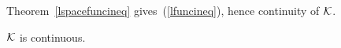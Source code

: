 Theorem~\ref{lspacefuncineq} gives~(\ref{lfuncineq}), hence continuity of $\cal K$.
\begin{thm}
$\cal K$ is continuous.
\end{thm}
